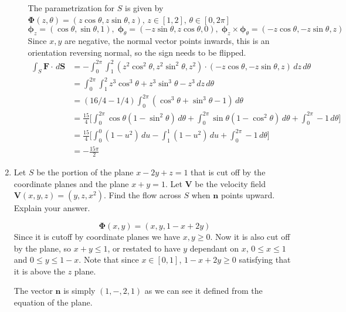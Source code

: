 \documentclass{article}
\begin{document}
\begin{enumerate}
\begin{enumerate}
                    The parametrization for $S$ is given by $\boldsymbol \Phi (z, \theta) = (z\cos \theta, z\sin \theta, z),\, z \in [1,2],\, \theta \in [0,2\pi]$
                        \[ \boldsymbol \phi_z = (\cos \theta, \sin \theta, 1) , \; \boldsymbol \phi_\theta = (-z\sin\theta, z\cos\theta, 0),\; \boldsymbol \phi_z \times \boldsymbol \phi_\theta = (-z\cos\theta, -z\sin\theta, z) \]
                        Since $x, y$ are negative, the normal vector points inwards, this is an orientation reversing normal, so the sign needs to be flipped.
                        \begin{align*}
                            \int_S \boldsymbol F \cdot \, d \boldsymbol S &= - \int_0^{2\pi} \int_1^2 (z^2\cos^2\theta, z^2\sin^2\theta, z^2) \cdot (-z\cos\theta, -z\sin\theta, z) \, dz \, d\theta \\
                            &= \int_0^{2\pi} \int_1^2 z^3\cos^3\theta + z^3\sin^3\theta - z^3 \, dz \, d\theta \\
                            &= (16/4 - 1/4)\int_0^{2\pi} (\cos^3\theta + \sin^3\theta - 1) \, d\theta \\
                            &= \frac{15}{4} \bigg[ \int_0^{2\pi} \cos\theta(1 - \sin^2 \theta) \, d\theta + \int_0^{2\pi} \sin\theta(1 - \cos^2 \theta)\, d\theta + \int_0^{2\pi} - 1 \, d\theta \bigg] \\
                            &= \frac{15}{4} \bigg[ \int_0^{0} (1 - u^2 ) \, du - \int_1^{1} (1 - u^2 )\, du + \int_0^{2\pi} - 1 \, d\theta \bigg] \\
                            &= -\frac{15\pi}{2}
                        \end{align*} 
        \end{enumerate}
    \newpage
    \item Let $S$ be the portion of the plane $x-2y+z=1$ that is cut off by the coordinate planes and the plane $x+y=1$. Let $\boldsymbol V$ be the velocity field $\boldsymbol V (x,y,z) = (y,z,x^2)$. Find the flow across $S$ when $\boldsymbol n$ points upward. Explain your answer.

    \[\boldsymbol \Phi (x,y) = (x, y, 1 -x + 2y)\]
    Since it is cutoff by coordinate planes we have $x,y\geq 0$. Now it is also cut off by the plane, so $x + y \leq 1$, or restated to have $y$ dependant on $x$, $0 \leq x \leq 1$ and $0 \leq y \leq 1- x$. Note that since $x \in [0, 1]$, $1 - x + 2y \geq 0$ satisfying that it is above the $z$ plane.

    The vector $\boldsymbol n$ is simply $(1,-,2,1)$ as we can see it defined from the equation of the plane.


\end{enumerate}
\end{document}
